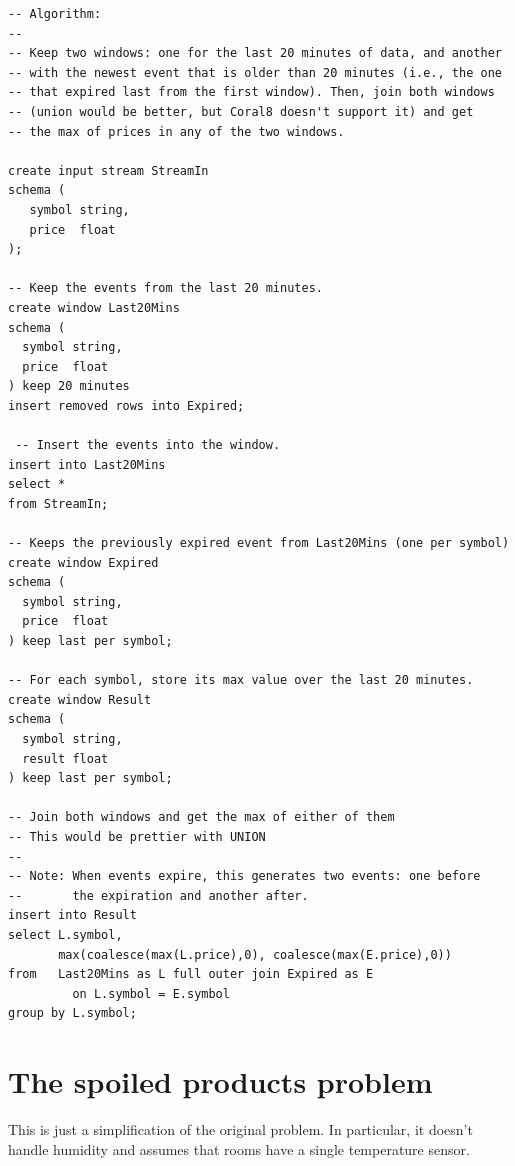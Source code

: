 \documentclass[a4,11pt]{report}
\begin{document}
\begin{lstlisting}
-- Algorithm:
--
-- Keep two windows: one for the last 20 minutes of data, and another
-- with the newest event that is older than 20 minutes (i.e., the one
-- that expired last from the first window). Then, join both windows
-- (union would be better, but Coral8 doesn't support it) and get
-- the max of prices in any of the two windows.

create input stream StreamIn
schema (
   symbol string,
   price  float
);

-- Keep the events from the last 20 minutes.
create window Last20Mins
schema (
  symbol string,
  price  float
) keep 20 minutes
insert removed rows into Expired;

 -- Insert the events into the window.
insert into Last20Mins
select *
from StreamIn;

-- Keeps the previously expired event from Last20Mins (one per symbol)
create window Expired
schema (
  symbol string,
  price  float
) keep last per symbol;

-- For each symbol, store its max value over the last 20 minutes.
create window Result
schema (
  symbol string,
  result float
) keep last per symbol;

-- Join both windows and get the max of either of them
-- This would be prettier with UNION
--
-- Note: When events expire, this generates two events: one before
--       the expiration and another after.
insert into Result
select L.symbol,
       max(coalesce(max(L.price),0), coalesce(max(E.price),0))
from   Last20Mins as L full outer join Expired as E
         on L.symbol = E.symbol
group by L.symbol;
\end{lstlisting}

\section{The spoiled products problem}
\label{sec:spoiled-products-solution}

This is just a simplification of the original problem. In particular,
it doesn't handle humidity and assumes that rooms have a single
temperature sensor.
\end{document}
